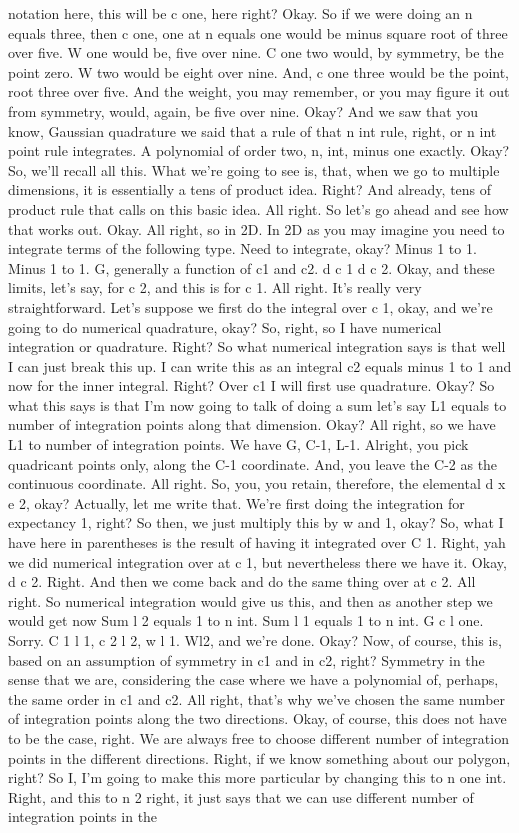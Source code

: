 \documentclass[10pt]{article}
\begin{document}
notation here, this will be c one, here right? Okay. So if we were doing an n equals three, then c one, one at n equals one would be minus square root of three over five. W one would be, five over nine. C one two would, by symmetry, be the point zero. W two would be eight over nine. And, c one three would be the point, root three over five. And the weight, you may remember, or you may figure it out from symmetry, would, again, be five over nine. Okay? And we saw that you know, Gaussian quadrature we said that a rule of that n int rule, right, or n int point rule integrates.  A polynomial of order two, n, int, minus one exactly. Okay? So, we'll recall all this. What we're going to see is, that, when we go to multiple dimensions, it is essentially a tens of product idea. Right? And already, tens of product rule that calls on this basic idea. All right. So let's go ahead and see how that works out. Okay. All right, so in 2D. In 2D as you may imagine you need to integrate terms of the following type. Need to integrate, okay? Minus 1 to 1. Minus 1 to 1. G, generally a function of c1 and c2. d c 1 d c 2. Okay, and these limits, let's say, for c 2, and this is for c 1. All right. It's really very straightforward. Let's suppose we first do the integral over c 1, okay, and we're going to do numerical quadrature, okay? So, right, so I have numerical integration or quadrature. Right? So what numerical integration says is that well I can just break this up. I can write this as an integral c2 equals minus 1 to 1 and now for the inner integral. Right? Over c1 I will first use quadrature. Okay? So what this says is that I'm now going to talk of doing a sum let's say L1 equals to number of integration points along that dimension. Okay? All right, so we have L1 to number of integration points. We have G, C-1, L-1. Alright, you pick quadricant points only, along the C-1 coordinate. And, you leave the C-2 as the continuous coordinate. All right. So, you, you retain, therefore, the elemental d x e 2, okay? Actually, let me write that. We're first doing the integration for expectancy 1, right? So then, we just multiply this by w and 1, okay? So, what I have here in parentheses is the result of having it integrated over C 1. Right, yah we did numerical integration over at c 1, but nevertheless there we have it. Okay, d c 2. Right. And then we come back and do the same thing over at c 2. All right. So numerical integration would give us this, and then as another step we would get now Sum l 2 equals 1 to n int. Sum l 1 equals 1 to n int. G c l one. Sorry. C 1 l 1, c 2 l 2, w l 1. Wl2, and we're done. Okay? Now, of course, this is, based on an assumption of symmetry in c1 and in c2, right? Symmetry in the sense that we are, considering the case where we have a polynomial of, perhaps, the same order in c1 and c2. All right, that's why we've chosen the same number of integration points along the two directions. Okay, of course, this does not have to be the case, right. We are always free to choose different number of integration points in the different directions. Right, if we know something about our polygon, right? So I, I'm going to make this more particular by changing this to n one int. Right, and this to n 2 right, it just says that we can use different number of integration points in the 
\end{document}
